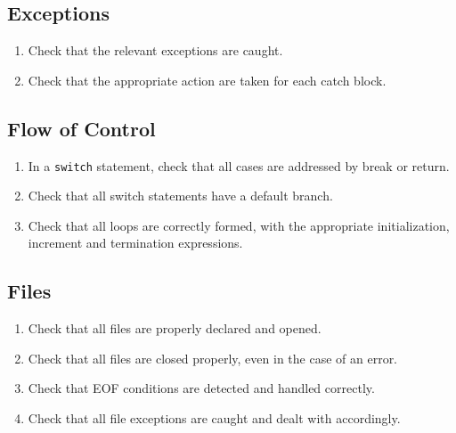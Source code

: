 \subsection*{Exceptions}\begin{enumerate}[resume, label=C\arabic*., ref=C\arabic*]
\item \checklistref Check that the relevant exceptions are caught.
\item \checklistref Check that the appropriate action are taken for each catch block.
\end{enumerate}

\subsection*{Flow of Control}\begin{enumerate}[resume, label=C\arabic*., ref=C\arabic*]
\item \checklistref In a \texttt{switch} statement, check that all cases are addressed by break or return.
\item \checklistref Check that all switch statements have a default branch.
\item \checklistref Check that all loops are correctly formed, with the appropriate initialization, increment and termination expressions.
\end{enumerate}

\subsection*{Files}\begin{enumerate}[resume, label=C\arabic*., ref=C\arabic*]
\item \checklistref Check that all files are properly declared and opened.
\item \checklistref Check that all files are closed properly, even in the case of an error.
\item \checklistref Check that EOF conditions are detected and handled correctly.
\item \checklistref Check that all file exceptions are caught and dealt with accordingly.
\end{enumerate}


